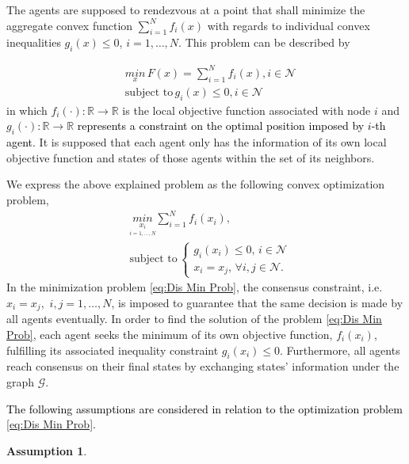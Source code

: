 \documentclass[letterpaper, 10 pt, conference]{ieeeconf}  %
\newtheorem{assumption}[theorem]{Assumption}
\newcommand{\crr}{\color{black}}
\begin{document}
{The agents are supposed to rendezvous at a point that shall minimize
the aggregate convex function $\sum_{i=1}^{N}f_{i}(x)$ with regards
to individual convex inequalities $g_{i}(x)\leq0$, $i=1,\ldots,N.$
This problem can be described by

\begin{equation}
\begin{split}&\underset{x}{min}\,F(x)=\sum_{i=1}^{N}f_{i}(x), i\in\mathcal{N}\\
&\text{subject to}\,g_{i}(x)\leq0,i\in\mathcal{N}
\end{split}
\label{eq:min Prob}
\end{equation}
in which $f_{i}\left(\cdot\right):\mathbb{R\rightarrow\mathbb{R}}$
is the local objective function associated with node $i$ and $g_{i}\left(\cdot\right):\mathbb{R\rightarrow\mathbb{R}}$
\textcolor{black}{represents a constraint on the optimal position
	imposed by $i$-th agent. }It is supposed that each agent only has
the information of its own local objective function and states of
those agents within the {\crr set of its neighbors.}

\textcolor{black}{}We express the above explained problem as the
following convex optimization problem,
\begin{equation}
\begin{split}&\underset{\underset{i=1,\ldots,N}{x_{i}}}{min}\sum_{i=1}^{N}f_{i}(x_{i}),\\
&\text{subject to}\,\begin{cases}
g_{i}(x_{i})\leq0,\,i\in\mathcal{N}\\
x_{i}=x_{j}, \,\forall i,j\in\mathcal{N}.
\end{cases}
\end{split}
\label{eq:Dis Min Prob}
\end{equation}
In the minimization problem \eqref{eq:Dis Min Prob}, the consensus
constraint, i.e. $x_{i}=x_{j},$ $i,j=1,\ldots,N$, is imposed to
guarantee that the same decision is made by all agents eventually.
In order to find the solution of the problem \eqref{eq:Dis Min Prob},
each agent seeks the minimum of its own objective function, $f_{i}(x_{i})$,
fulfilling its associated inequality constraint $g_{i}(x_{i})\leq0.$
Furthermore, all agents reach consensus on their final states by exchanging
states' information under the graph $\mathcal{{G}}$.

\textcolor{black}{The following assumptions are considered in relation
	to the optimization problem }\eqref{eq:Dis Min Prob}\textcolor{black}{.}
\begin{assumption}
\begin{enumerate} \label{assum:1}


\end{enumerate}
\end{assumption}}
\end{document}

